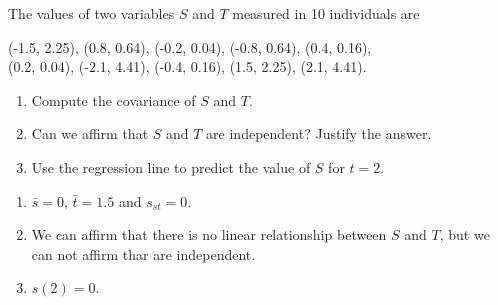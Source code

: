 {The values of two variables $S$ and $T$ measured in 10 individuals are
\begin{center}
(-1.5, 2.25), (0.8, 0.64), (-0.2, 0.04), (-0.8, 0.64), (0.4, 0.16),\\
(0.2, 0.04), (-2.1, 4.41), (-0.4, 0.16), (1.5, 2.25), (2.1, 4.41).
\end{center}

\begin{enumerate}
\item Compute the covariance of $S$ and $T$.
\item Can we affirm that $S$ and $T$ are independent?
Justify the answer.
\item Use the regression line to predict the value of $S$ for $t=2$.
\end{enumerate}
}
{
\begin{enumerate}
\item $\bar s=0$, $\bar t=1.5$ and $s_{st}=0$.
\item We can affirm that there is no linear relationship between $S$ and $T$, but we can not affirm thar are independent.
\item $s(2)=0$.
\end{enumerate}
}
{}



